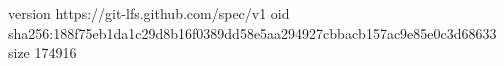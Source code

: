 version https://git-lfs.github.com/spec/v1
oid sha256:188f75eb1da1c29d8b16f0389dd58e5aa294927cbbacb157ac9e85e0c3d68633
size 174916
